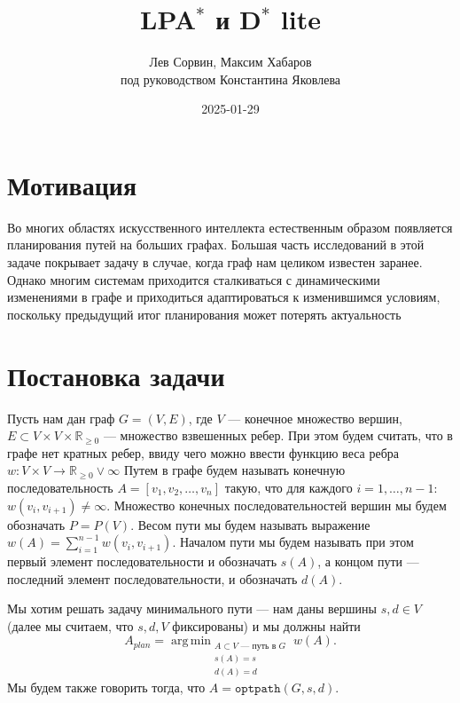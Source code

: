 \documentclass[11pt]{article}
\newcommand{\realpositive}{\mathbb{R}_{\geqslant 0}}
\DeclareMathOperator*{\argmin}{arg\,min}
\begin{document}
    \title{LPA$^*$ и D$^*$ lite}
    \author{Лев Сорвин, Максим Хабаров \\ под руководством Константина Яковлева}
    \date{2025-01-29}
    \maketitle


    \section{Мотивация}
    Во многих областях искусственного интеллекта естественным образом появляется планирования путей на больших графах.
    Большая часть исследований в этой задаче покрывает задачу в случае, когда граф нам целиком известен заранее.
    Однако многим системам приходится сталкиваться с динамическими изменениями в графе и приходиться адаптироваться к изменившимся условиям, поскольку предыдущий итог планирования может потерять актуальность


    \section{Постановка задачи}
    Пусть нам дан граф $G = (V, E)$, где $V$ --- конечное множество вершин, $E \subset V \times V \times \realpositive$ --- множество взвешенных ребер.
    При этом будем считать, что в графе нет кратных ребер, ввиду чего можно ввести функцию веса ребра $w: V \times V \rightarrow {\realpositive \lor \infty}$
    Путем в графе будем называть конечную последовательность $A = [v_1, v_2, \dots, v_n]$ такую, что для каждого $i = 1, \dots, n-1$: $w(v_i, v_{i+1}) \neq \infty$.
    Множество конечных последовательностей вершин мы будем обозначать $P = P(V)$.
    Весом пути мы будем называть выражение $w(A) = \sum_{i = 1}^{n-1} w(v_i, v_{i+1})$.
    Началом пути мы будем называть при этом первый элемент последовательности и обозначать $s(A)$, а концом пути --- последний элемент последовательности, и обозначать $d(A)$.

    Мы хотим решать задачу минимального пути --- нам даны вершины $s, d \in V$  (далее мы считаем, что $s, d, V$ фиксированы) и мы должны найти
    $$A_{plan}= \argmin_{\substack{A \subset V \text{ --- путь в } G \\ s(A) = s \\ d(A) = d}} w(A).$$
    Мы будем также говорить тогда, что $A = \mathtt{optpath}(G, s, d)$.
\end{document}
